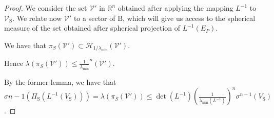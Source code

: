 \documentclass[letterpaper, 10 pt, conference]{ieeeconf}  %
\newcommand{\R}{\mathbb{R} }
\newcommand{\proj}{\Pi }
\newcommand{\sphere}{\text{S}}
\newcommand{\ball}{\text{B}}
\newcommand{\calH}{\mathcal{H}}
\newcommand{\calV}{\mathcal{V}}
\begin{document}
\begin{proof}
We consider the set $\calV'$ in $\R^n$ obtained after applying the mapping $L^{-1}$ to $\calV_{\sphere}$. We relate now $\calV'$ to a sector of $\ball$, which will give us access to the spherical measure of the set obtained after spherical projection of $L^{-1}(E_P)$.

We have that $\pi_S(\calV') \subset \calH_{1/\lambda_{\min}} (\calV') $.


Hence $\lambda(\pi_S(\calV')) \leq \frac{1}{\lambda_{\min}}^n (\calV')$.

By the former lemma, we have that $ \sigma{n-1}(\proj_\sphere(L^{-1}(V_\sphere))) = \lambda(\pi_S(\calV')) \leq \det(L^{-1}) \left(\frac{1}{\lambda_{\min}(L^{-1})}\right)^n \sigma^{n-1}(V_\sphere)$.





\end{proof}
\end{document}

